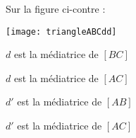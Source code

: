 \begin{QCM}
\begin{GroupeQCM}
    
  \begin{exercice}
     Sur la figure ci-contre : \vspace{-2em}\begin{center}\texttt{[image: triangleABCdd]}\end{center}\vspace{-1em}
      \begin{ChoixQCM}{4}
      \item $d$ est la médiatrice de $[BC]$
      \item $d$ est la médiatrice de $[AC]$
      \item $d'$ est la médiatrice de $[AB]$
      \item $d'$ est la médiatrice de $[AC]$
      \end{ChoixQCM}
\begin{corrige}
   \end{corrige}
    \end{exercice}
  \end{GroupeQCM}  
 \end{QCM}  
 
